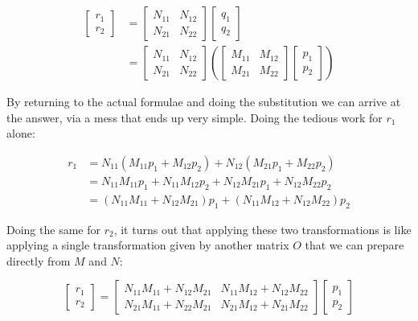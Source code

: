 \begin{equation}
\begin{split}
\begin{bmatrix}
r_1 \\
r_2
\end{bmatrix}
&=
\begin{bmatrix}
N_{11} & N_{12} \\
N_{21} & N_{22}
\end{bmatrix}
\begin{bmatrix}
q_1 \\
q_2
\end{bmatrix} \\
&= 
\begin{bmatrix}
N_{11} & N_{12} \\
N_{21} & N_{22}
\end{bmatrix}
\left(
\begin{bmatrix}
M_{11} & M_{12} \\
M_{21} & M_{22}
\end{bmatrix}
\begin{bmatrix}
p_1 \\
p_2
\end{bmatrix}
\right)
\end{split}
\label{eqn:matrix-bracketing}
\end{equation}

By returning to the actual formulae and doing the substitution we can arrive at the answer, via a mess that ends up very simple. Doing the tedious work for $r_1$ alone:

\begin{equation}
\begin{split}
r_1 &= N_{11}(M_{11}p_1 + M_{12}p_2) + N_{12}(M_{21}p_1 + M_{22}p_2)  \\
    &= N_{11}M_{11}p_1 + N_{11}M_{12}p_2 + N_{12}M_{21}p_1 + N_{12}M_{22}p_2    \\
    &= (N_{11}M_{11} + N_{12}M_{21})p_1 + (N_{11}M_{12} + N_{12}M_{22})p_2    
\end{split}
\end{equation}

Doing the same for $r_2$, it turns out that applying these two transformations is like applying a single transformation given by another matrix $O$ that we can prepare directly from $M$ and $N$:

$$
\begin{bmatrix}
r_1 \\
r_2
\end{bmatrix}
= 
\begin{bmatrix}
N_{11}M_{11} + N_{12}M_{21} & N_{11}M_{12} + N_{12}M_{22} \\
N_{21}M_{11} + N_{22}M_{21} & N_{21}M_{12} + N_{21}M_{22}
\end{bmatrix}
\begin{bmatrix}
p_1 \\
p_2
\end{bmatrix}
$$

